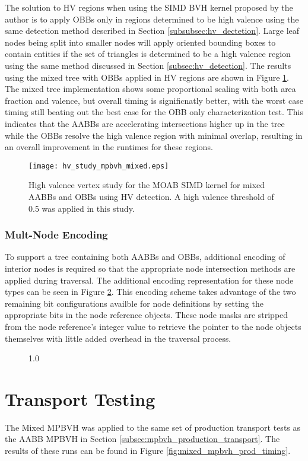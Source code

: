 The solution to HV regions when using the SIMD BVH kernel proposed by the author
is to apply OBBs only in regions determined to be high valence using the same
detection method described in Section \ref{subsubsec:hv_dectetion}. Large leaf
nodes being split into smaller nodes will apply oriented bounding boxes to
contain entities if the set of triangles is determined to be a high valence
region using the same method discussed in Section \ref{subsec:hv_detection}.
The results using the mixed tree with OBBs applied in HV regions are shown in
Figure \ref{fig:hv_study_mpbvh_mixed}. The mixed tree implementation shows some
proportional scaling with both area fraction and valence, but overall timing
is significnatly better, with the worst case timing still beating out the best
case for the OBB only characterization test. This indicates that the AABBs are
accelerating intersections higher up in the tree while the OBBs resolve the high
valence region with minimal overlap, resulting in an overall improvement in the
runtimes for these regions.

\begin{figure}[H]
  \centering
  \texttt{[image: hv\_study\_mpbvh\_mixed.eps]}
  \caption{High valence vertex study for the MOAB SIMD kernel for mixed AABBs
    and OBBs using HV detection. A high valence threshold of 0.5 was applied in
    this study.}
  \label{fig:hv_study_mpbvh_mixed}
\end{figure}

\subsubsection{Mult-Node Encoding}

To support a tree containing both AABBs and OBBs, additional encoding of
interior nodes is required so that the appropriate node intersection methods are
applied during traversal. The additional encoding representation for these node
types can be seen in Figure \ref{fig:mixed_node_encoding}. This encoding scheme
takes advantage of the two remaining bit configurations availble for node
definitions by setting the appropriate bits in the node reference objects. These
node masks are stripped from the node reference's integer value to retrieve the
pointer to the node objects themselves with little added overhead in the
traversal process.

\begin{figure}[H]
  {1.0\textwidth}
  \label{fig:mixed_node_encoding}
\end{figure}

\section{Transport Testing}

The Mixed MPBVH was applied to the same set of production transport tests as the
AABB MPBVH in Section \ref{subsec:mpbvh_production_transport}. The results of
these runs can be found in Figure \ref{fig:mixed_mpbvh_prod_timing}.






